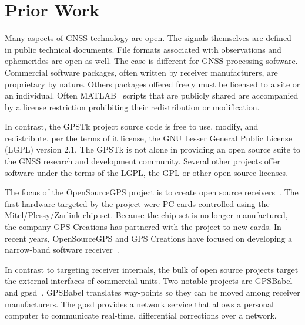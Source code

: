 \section*{Prior Work}

Many aspects of GNSS technology are open. The signals themselves are
defined in public technical documents. File formats associated with
observations and ephemerides are open as well. The case is different
for GNSS processing software. Commercial software packages, often
written by receiver manufacturers, are proprietary by nature.  Others
packages offered freely must be licensed to a site or an
individual. Often \mbox{MATLAB \textregistered} scripts that are
publicly shared are accompanied by a license restriction prohibiting
their redistribution or modification.

In contrast, the GPSTk project source code is free to use, modify, and
redistribute, per the terms of it license, the GNU Lesser General Public License
(LGPL) version 2.1. The GPSTk is not alone in providing an open source suite to
the GNSS research and development community. Several other projects
offer software under the terms of the LGPL, the GPL or other open
source licenses.

The focus of the OpenSourceGPS project is to create open source
receivers~\cite{osgpsfirstpaper}. The first hardware targeted by the
project were PC cards controlled using the Mitel/Plessy/Zarlink chip set. 
Because the chip set is no longer manufactured, the company GPS Creations 
has partnered with the project to new cards. In recent years, OpenSourceGPS and GPS
Creations have focused on developing a narrow-band software
receiver~\cite{osgpsemulator,osgpsfullswrx}.

In contrast to targeting receiver internals, the bulk of open source
projects target the external interfaces of commercial units. Two
notable projects are GPSBabel and
gpsd~\cite{gpsbabelwebsite,gpsdwebsite}. GPSBabel translates way-points
so they can be moved among receiver manufacturers. The gpsd provides a
network service that allows a personal computer to communicate
real-time, differential corrections over a network.

